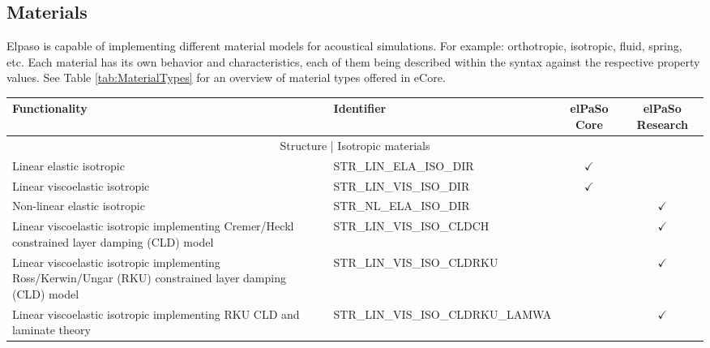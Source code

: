 \subsection{Materials}
Elpaso is capable of implementing different material models for acoustical simulations. For
example: orthotropic, isotropic, fluid, spring, etc. Each material has its own behavior and
characteristics, each of them being described within the syntax against the respective property
values. See Table \ref{tab:MaterialTypes} for an overview of material types offered in eCore.

\begin{longtable}{p{6cm}p{6cm}cc}
    \hline
    Functionality                                                                                              & Identifier                        & \multicolumn{1}{c}{elPaSo Core} & \multicolumn{1}{c}{elPaSo Research} \\ \hline
    \multicolumn{4}{c}{Structure | Isotropic materials}                                                                                                                                                                    \\ \hline
    Linear elastic isotropic                                                                                   & STR\_LIN\_ELA\_ISO\_DIR           & $\checkmark$                    &                                     \\
    Linear viscoelastic isotropic                                                                              & STR\_LIN\_VIS\_ISO\_DIR           & $\checkmark$                    &                                     \\
    Non-linear elastic isotropic                                                                               & STR\_NL\_ELA\_ISO\_DIR            &                                 & $\checkmark$                        \\
    Linear viscoelastic isotropic   implementing Cremer/Heckl constrained layer damping (CLD) model            & STR\_LIN\_VIS\_ISO\_CLDCH         &                                 & $\checkmark$                        \\
    Linear viscoelastic isotropic   implementing Ross/Kerwin/Ungar (RKU) constrained layer damping (CLD) model & STR\_LIN\_VIS\_ISO\_CLDRKU        &                                 & $\checkmark$                        \\
    Linear viscoelastic isotropic   implementing RKU CLD and laminate theory                                   & STR\_LIN\_VIS\_ISO\_CLDRKU\_LAMWA &                                 & $\checkmark$                        \\\hline

\end{longtable}
